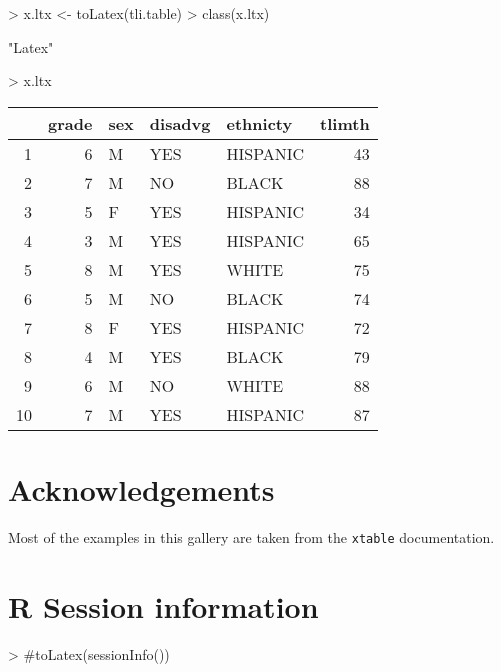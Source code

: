 \documentclass[letterpaper]{article}
\begin{document}
\begin{Schunk}
\begin{Sinput}
> x.ltx <- toLatex(tli.table)
> class(x.ltx)
\end{Sinput}
\begin{Soutput}
[1] "Latex"
\end{Soutput}
\begin{Sinput}
> x.ltx
\end{Sinput}
\begin{Soutput}
% latex table generated in R 3.1.1 by xtable 1.7-3 package
% 
\begin{table}[ht]
\centering
\begin{tabular}{|rr|lp{3cm}l|r|}
  \hline
 & grade & sex & disadvg & ethnicty & tlimth \\ 
  \hline
1 & 6 & M & YES & HISPANIC & 43 \\ 
  2 &  7 & M & NO & BLACK & 88 \\ 
  3 &   5 & F & YES & HISPANIC &  34 \\ 
  4 &    3 & M & YES & HISPANIC &   65 \\ 
  5 &     8 & M & YES & WHITE &    75 \\ 
  6 & 5 & M & NO & BLACK & 74 \\ 
  7 &  8 & F & YES & HISPANIC & 72 \\ 
  8 &   4 & M & YES & BLACK &  79 \\ 
  9 &    6 & M & NO & WHITE &   88 \\ 
  10 &     7 & M & YES & HISPANIC &    87 \\ 
   \hline
\end{tabular}
\end{table}
\end{Soutput}
\end{Schunk}

\section{Acknowledgements}
Most of the examples in this gallery are taken from the {\tt xtable} documentation.
\section{R Session information}
\begin{Schunk}
\begin{Sinput}
> #toLatex(sessionInfo())
\end{Sinput}
\end{Schunk}
\end{document}
